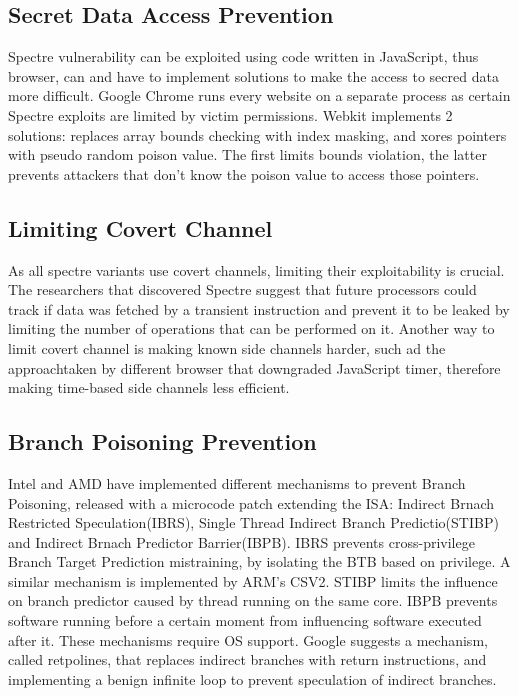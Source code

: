 \subsection{Secret Data Access Prevention}
Spectre vulnerability can be exploited using code written in JavaScript, thus browser, can and have to implement solutions to make the access to secred data more difficult.
Google Chrome runs every website on a separate process as certain Spectre exploits are limited by victim permissions.
Webkit implements 2 solutions: replaces array bounds checking with index masking, and xores pointers with pseudo random poison value.
The first limits bounds violation, the latter prevents attackers that don't know the poison value to access those pointers.
\subsection{Limiting Covert Channel}
As all spectre variants use covert channels, limiting their exploitability is crucial.
The researchers that discovered Spectre suggest that future processors could track if data was fetched by a transient instruction and prevent it to be leaked by limiting the number of operations that can be performed on it.
Another way to limit covert channel is making known side channels harder, such ad the approachtaken by different browser that downgraded JavaScript timer, therefore making time-based side channels less efficient.
\subsection{Branch Poisoning Prevention}
Intel and AMD have implemented different mechanisms to prevent Branch Poisoning, released with a microcode patch extending the ISA: Indirect Brnach Restricted Speculation(IBRS), Single Thread Indirect Branch Predictio(STIBP) and Indirect Brnach Predictor Barrier(IBPB).
IBRS prevents cross-privilege Branch Target Prediction mistraining, by isolating the BTB based on privilege. A similar mechanism is implemented by ARM's CSV2.
STIBP limits the influence on branch predictor caused by thread running on the same core.
IBPB prevents software running before a certain moment from influencing software executed after it.
These mechanisms require OS support.
Google suggests a mechanism, called retpolines, that replaces indirect branches with return instructions, and implementing a benign infinite loop to prevent speculation of indirect branches.
